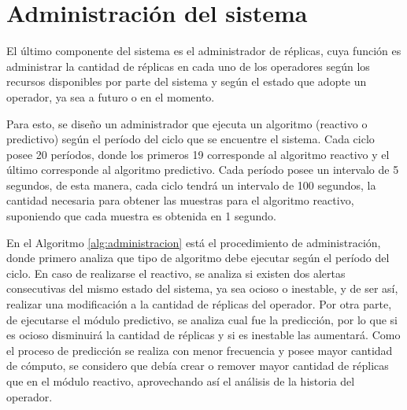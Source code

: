 \section{Administración del sistema}

El último componente del sistema es el administrador de réplicas, cuya función es administrar la cantidad de réplicas en cada uno de los operadores según los recursos disponibles por parte del sistema y según el estado que adopte un operador, ya sea a futuro o en el momento.

Para esto, se diseño un administrador que ejecuta un algoritmo (reactivo o predictivo) según el período del ciclo que se encuentre el sistema. Cada ciclo posee 20 períodos, donde los primeros 19 corresponde al algoritmo reactivo y el último corresponde al algoritmo predictivo. Cada período posee un intervalo de 5 segundos, de esta manera, cada ciclo tendrá un intervalo de 100 segundos, la cantidad necesaria para obtener las muestras para el algoritmo reactivo, suponiendo que cada muestra es obtenida en 1 segundo.

En el Algoritmo \ref{alg:administracion} está el procedimiento de administración, donde primero analiza que tipo de algoritmo debe ejecutar según el período del ciclo. En caso de realizarse el reactivo, se analiza si existen dos alertas consecutivas del mismo estado del sistema, ya sea ocioso o inestable, y de ser así, realizar una modificación a la cantidad de réplicas del operador. Por otra parte, de ejecutarse el módulo predictivo, se analiza cual fue la predicción, por lo que si es ocioso disminuirá la cantidad de réplicas y si es inestable las aumentará. Como el proceso de predicción se realiza con menor frecuencia y posee mayor cantidad de cómputo, se considero que debía crear o remover mayor cantidad de réplicas que en el módulo reactivo, aprovechando así el análisis de la historia del operador.

